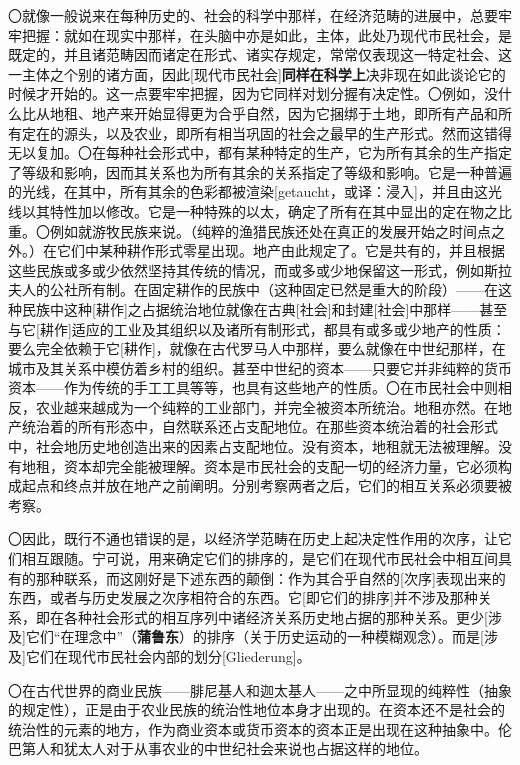 \documentclass[a5paper,twoside,10.5pt]{ctexart}
\begin{document}
〇就像一般说来在每种历史的、社会的科学中那样，在经济范畴的进展中，总要牢牢把握：就如在现实中那样，在头脑中亦是如此，主体，此处乃现代市民社会，是既定的，并且诸范畴因而诸定在形式、诸实存规定，常常仅表现这一特定社会、这一主体之个别的诸方面，因此[现代市民社会]\textbf{同样在科学上}决非现在如此谈论它的时候才开始的。这一点要牢牢把握，因为它同样对划分握有决定性。〇例如，没什么比从地租、地产来开始显得更为合乎自然，因为它捆绑于土地，即所有产品和所有定在的源头，以及农业，即所有相当巩固的社会之最早的生产形式。然而这错得无以复加。〇在每种社会形式中，都有某种特定的生产，它为所有其余的生产指定了等级和影响，因而其关系也为所有其余的关系指定了等级和影响。它是一种普遍的光线，在其中，所有其余的色彩都被渲染[getaucht，或译：浸入]，并且由这光线以其特性加以修改。它是一种特殊的以太，确定了所有在其中显出的定在物之比重。〇例如就游牧民族来说。（纯粹的渔猎民族还处在真正的发展开始之时间点之外。）在它们中某种耕作形式零星出现。地产由此规定了。它是共有的，并且根据这些民族或多或少依然坚持其传统的情况，而或多或少地保留这一形式，例如斯拉夫人的公社所有制。在固定耕作的民族中（这种固定已然是重大的阶段）——在这种民族中这种[耕作]之占据统治地位就像在古典[社会]和封建[社会]中那样——甚至与它[耕作]适应的工业及其组织以及诸所有制形式，都具有或多或少地产的性质：要么完全依赖于它[耕作]，就像在古代罗马人中那样，要么就像在中世纪那样，在城市及其关系中模仿着乡村的组织。甚至中世纪的资本——只要它并非纯粹的货币资本——作为传统的手工工具等等，也具有这些地产的性质。〇在市民社会中则相反，农业越来越成为一个纯粹的工业部门，并完全被资本所统治。地租亦然。在地产统治着的所有形态中，自然联系还占支配地位。在那些资本统治着的社会形式中，社会地历史地创造出来的因素占支配地位。没有资本，地租就无法被理解。没有地租，资本却完全能被理解。资本是市民社会的支配一切的经济力量，它必须构成起点和终点并放在地产之前阐明。分别考察两者之后，它们的相互关系必须要被考察。

〇因此，既行不通也错误的是，以经济学范畴在历史上起决定性作用的次序，让它们相互跟随。宁可说，用来确定它们的排序的，是它们在现代市民社会中相互间具有的那种联系，而这刚好是下述东西的颠倒：作为其合乎自然的[次序]表现出来的东西，或者与历史发展之次序相符合的东西。它[即它们的排序]并不涉及那种关系，即在各种社会形式的相互序列中诸经济关系历史地占据的那种关系。更少[涉及]它们“在理念中”（\textbf{蒲鲁东}）的排序（关于历史运动的一种模糊观念）。而是[涉及]它们在现代市民社会内部的划分[Gliederung]。

〇在古代世界的商业民族——腓尼基人和迦太基人——之中所显现的纯粹性（抽象的规定性），正是由于农业民族的统治性地位本身才出现的。在资本还不是社会的统治性的元素的地方，作为商业资本或货币资本的资本正是出现在这种抽象中。伦巴第人和犹太人对于从事农业的中世纪社会来说也占据这样的地位。
\end{document}
